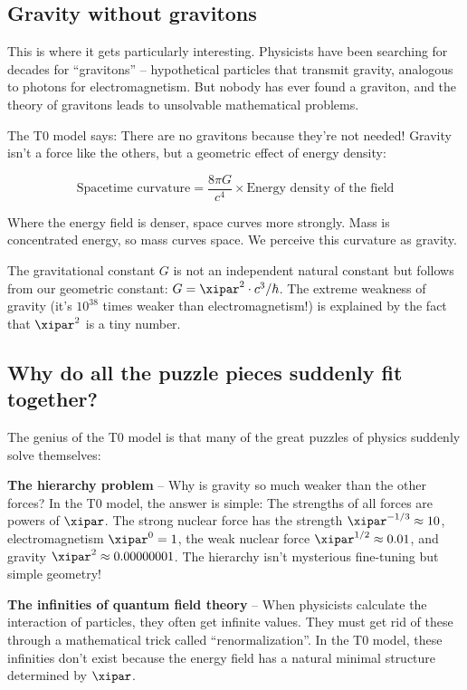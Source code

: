 	\subsection{Gravity without gravitons}
	
	This is where it gets particularly interesting. Physicists have been searching for decades for ``gravitons'' -- hypothetical particles that transmit gravity, analogous to photons for electromagnetism. But nobody has ever found a graviton, and the theory of gravitons leads to unsolvable mathematical problems.
	
	\begin{revolutionary}
		The T0 model says: There are no gravitons because they're not needed! Gravity isn't a force like the others, but a geometric effect of energy density:
		
		\begin{equation}
			\text{Spacetime curvature} = \frac{8\pi G}{c^4} \times \text{Energy density of the field}
		\end{equation}
		
		Where the energy field is denser, space curves more strongly. Mass is concentrated energy, so mass curves space. We perceive this curvature as gravity.
	\end{revolutionary}
	
	The gravitational constant $G$ is not an independent natural constant but follows from our geometric constant: $G = \xipar^2 \cdot c^3/\hbar$. The extreme weakness of gravity (it's $10^{38}$ times weaker than electromagnetism!) is explained by the fact that $\xipar^2$ is a tiny number.
	
	\subsection{Why do all the puzzle pieces suddenly fit together?}
	
	The genius of the T0 model is that many of the great puzzles of physics suddenly solve themselves:
	
	\textbf{The hierarchy problem} -- Why is gravity so much weaker than the other forces? In the T0 model, the answer is simple: The strengths of all forces are powers of $\xipar$. The strong nuclear force has the strength $\xipar^{-1/3} \approx 10$, electromagnetism $\xipar^0 = 1$, the weak nuclear force $\xipar^{1/2} \approx 0.01$, and gravity $\xipar^2 \approx 0.00000001$. The hierarchy isn't mysterious fine-tuning but simple geometry!
	
	\textbf{The infinities of quantum field theory} -- When physicists calculate the interaction of particles, they often get infinite values. They must get rid of these through a mathematical trick called ``renormalization''. In the T0 model, these infinities don't exist because the energy field has a natural minimal structure determined by $\xipar$.
	
